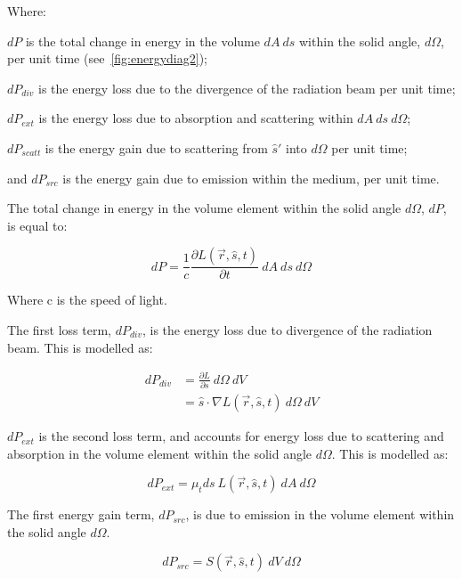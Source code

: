 \noindent Where:

\indent $dP$ is the total change in energy in the volume $dA\ ds$ within the solid angle, $d\Omega$, per unit time (see~\cref{fig:energydiag2});

\indent $dP_{div}$ is the energy loss due to the divergence of the radiation beam per unit time;

\indent $dP_{ext}$ is the energy loss due to absorption and scattering within $dA\ ds\ d\Omega$;

\indent $dP_{scatt}$ is the energy gain due to scattering from $\hat{s}'$ into $d\Omega$ per unit time;

\indent and $dP_{src}$ is the energy gain due to emission within the medium, per unit time.

\medskip

The total change in energy in the volume element within the solid angle $d\Omega$, $dP$, is equal to:

\begin{equation}
	dP=\frac{1}{c}\frac{\partial L(\vec{r},\hat{s},t)}{\partial t}\ dA\ ds\ d\Omega
	\label{eqn:p}
\end{equation}

\noindent Where c is the speed of light.

\medskip

The first loss term, $dP_{div}$, is the energy loss due to divergence of the radiation beam. This is modelled as:

\begin{align}
	dP_{div}&=\frac{\partial L}{\partial s}\ d\Omega\ dV \\
		    &=\hat{s} \cdot \nabla L(\vec{r},\hat{s},t)\ d\Omega\ dV
    \label{eqn:pdiv}
\end{align}

$dP_{ext}$ is the second loss term, and accounts for energy loss due to scattering and absorption in the volume element within the solid angle $d\Omega$. This is modelled as:

\begin{equation}
	dP_{ext}=\mu_t ds\ L(\vec{r},\hat{s},t)\ dA\ d\Omega
	\label{eqn:pext}
\end{equation}

The first energy gain term, $dP_{src}$, is due to emission in the volume element within the solid angle $d\Omega$. 

\begin{equation}
	dP_{src}=S(\vec{r},\hat{s},t)\ dV\ d\Omega
	\label{eqn:psrc}
\end{equation}

